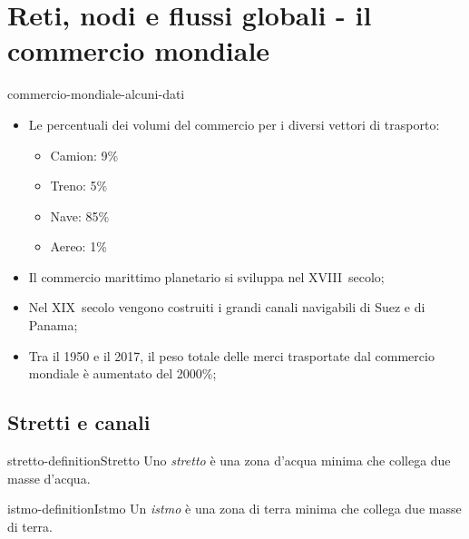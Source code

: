 \documentclass[preview]{standalone}
\begin{document}
\genpage

\section{Reti, nodi e flussi globali - il commercio mondiale}

\begin{snippet}{commercio-mondiale-alcuni-dati}
    \vspace*{-0.25cm}
    \begin{itemize}
        \item Le percentuali dei volumi del commercio per i diversi vettori di trasporto:
            \begin{itemize}
                \item Camion: 9\%
                \item Treno: 5\%
                \item Nave: 85\%
                \item Aereo: 1\%
            \end{itemize}
        \item Il commercio marittimo planetario si sviluppa nel XVIII\textdegree\, secolo;
        \item Nel XIX\textdegree\, secolo vengono costruiti i grandi canali navigabili di Suez e di
            Panama;
        \item Tra il 1950 e il 2017, il peso totale delle merci trasportate dal commercio mondiale
            è aumentato del 2000\%;
    \end{itemize} 
\end{snippet}

\subsection{Stretti e canali}

\begin{snippetdefinition}{stretto-definition}{Stretto}
    Uno \textit{stretto} è una zona d'acqua minima che collega due masse d'acqua.
\end{snippetdefinition}

\begin{snippetdefinition}{istmo-definition}{Istmo}
    Un \textit{istmo} è una zona di terra minima che collega due masse di terra.
\end{snippetdefinition}
\end{document}
